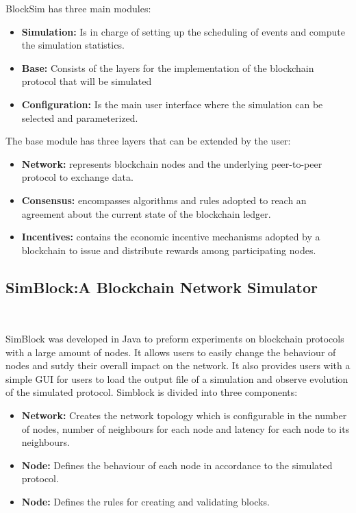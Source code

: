 BlockSim has three main modules:
\begin{itemize}
  \item \textbf{Simulation:} Is in charge of setting up the scheduling of events and compute
  the simulation statistics.
  \item \textbf{Base:} Consists of the layers for the implementation of the blockchain protocol
  that will be simulated
  \item \textbf{Configuration:}  Is the main user interface where the simulation can be 
  selected and parameterized.
\end{itemize}

The base module has three layers that can be extended by the user:

\begin{itemize}
  \item \textbf{Network:} represents blockchain nodes and the underlying peer-to-peer protocol
  to exchange data.
  \item \textbf{Consensus:} encompasses algorithms and rules adopted to reach an agreement 
  about the current state of the blockchain ledger.
  \item \textbf{Incentives:} contains the economic incentive mechanisms adopted by a 
  blockchain to issue and distribute rewards among participating nodes.
\end{itemize}

\subsection{SimBlock:A Blockchain Network Simulator}~\label{subsec:simblock}

SimBlock was developed in Java to preform experiments on blockchain protocols
with a large amount of nodes. It allows users to easily change the behaviour of nodes
and sutdy their overall impact on the network. It also provides users with a simple GUI for
users to load the output file of a simulation and observe evolution of the simulated protocol.
Simblock is divided into three components:

\begin{itemize}
  \item \textbf{Network:} Creates the network topology which is configurable in the number
  of nodes, number of neighbours for each node and latency for each node to its neighbours.
  \item \textbf{Node:} Defines the behaviour of each node in accordance to the simulated protocol.
  \item \textbf{Node:} Defines the rules for creating and validating blocks.
\end{itemize}


